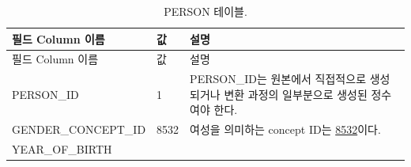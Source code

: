 \documentclass[10.5pt]{book}
\theoremstyle{definition}
\theoremstyle{definition}
\theoremstyle{definition}
\theoremstyle{remark}
\begin{document}
\begin{longtable}[]{@{}lll@{}}
\caption{\label{tab:person} PERSON 테이블.}\tabularnewline
\toprule
\begin{minipage}[b]{0.28\columnwidth}\raggedright\strut
필드 Column 이름\strut
\end{minipage} & \begin{minipage}[b]{0.16\columnwidth}\raggedright\strut
값\strut
\end{minipage} & \begin{minipage}[b]{0.48\columnwidth}\raggedright\strut
설명\strut
\end{minipage}\tabularnewline
\midrule
\endfirsthead
\toprule
\begin{minipage}[b]{0.28\columnwidth}\raggedright\strut
필드 Column 이름\strut
\end{minipage} & \begin{minipage}[b]{0.16\columnwidth}\raggedright\strut
값\strut
\end{minipage} & \begin{minipage}[b]{0.48\columnwidth}\raggedright\strut
설명\strut
\end{minipage}\tabularnewline
\midrule
\endhead
\begin{minipage}[t]{0.28\columnwidth}\raggedright\strut
PERSON\_ID\strut
\end{minipage} & \begin{minipage}[t]{0.16\columnwidth}\raggedright\strut
1\strut
\end{minipage} & \begin{minipage}[t]{0.48\columnwidth}\raggedright\strut
PERSON\_ID는 원본에서 직접적으로 생성되거나 변환 과정의 일부분으로
생성된 정수여야 한다.\strut
\end{minipage}\tabularnewline
\begin{minipage}[t]{0.28\columnwidth}\raggedright\strut
GENDER\_CONCEPT\_ID\strut
\end{minipage} & \begin{minipage}[t]{0.16\columnwidth}\raggedright\strut
8532\strut
\end{minipage} & \begin{minipage}[t]{0.48\columnwidth}\raggedright\strut
여성을 의미하는 concept ID는
\href{http://athena.ohdsi.org/search-terms/terms/8532}{8532}이다.\strut
\end{minipage}\tabularnewline
\begin{minipage}[t]{0.28\columnwidth}\raggedright\strut
YEAR\_OF\_BIRTH\strut
\end{minipage} & \begin{minipage}[t]{0.16\columnwidth}\raggedright\strut

\end{minipage}
\end{longtable}
\end{document}
